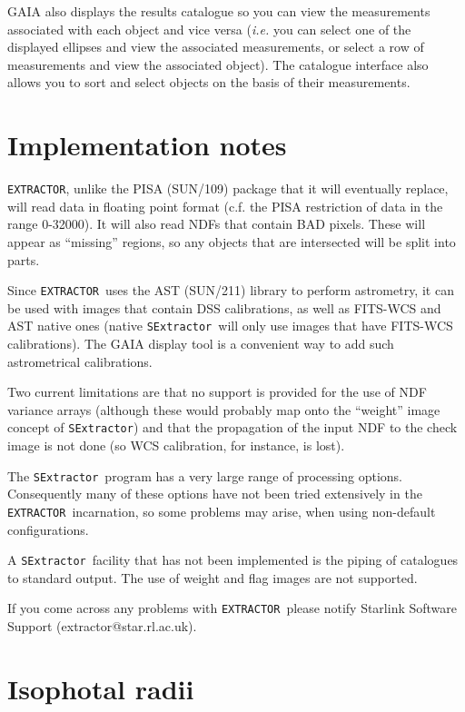 \documentclass[twoside,11pt]{article}
\newcommand{\htmladdnormallink}[2]{#1}
\newcommand{\xref}[3]{#1}
\newcommand{\xlabel}[1]{}
\renewcommand{\_}{\texttt{\symbol{95}}}
\newcommand{\EXTRACTOR}{\texttt{EXTRACTOR}}
\newcommand{\SExtractor}{\texttt{SExtractor}}
\begin{document}
GAIA also displays the results catalogue so you can view the
measurements associated with each object and vice versa (\textit{i.e.}
you can select one of the displayed ellipses and view the associated
measurements, or select a row of measurements and view the associated
object). The catalogue interface also allows you to sort and select
objects on the basis of their measurements.

\section{\label{implementation_notes}\xlabel{implementation_notes}Implementation notes}

\EXTRACTOR, unlike the PISA (\xref{SUN/109}{sun109}{}) package that it
will eventually replace, will read data in floating point format
(c.f. the PISA restriction of data in the range 0-32000).  It will
also read NDFs that contain BAD pixels. These will appear as
``missing'' regions, so any objects that are intersected will be split
into parts.

Since \EXTRACTOR\ uses the AST (\xref{SUN/211}{sun211}{}) library to
perform astrometry, it can be used with images that contain DSS
calibrations, as well as FITS-WCS and AST native ones (native
\SExtractor\ will only use images that have FITS-WCS
calibrations). The GAIA display tool is a convenient way to add such
astrometrical calibrations.

Two current limitations are that no support is provided for the use of
NDF variance arrays (although these would probably map onto the
``weight'' image concept of \SExtractor) and that the propagation of
the input NDF to the check image is not done (so WCS calibration, for
instance, is lost).

The \SExtractor\ program has a very large range of processing
options. Consequently many of these options have not been tried
extensively in the \EXTRACTOR\ incarnation, so some problems may
arise, when using non-default configurations.

A \SExtractor\ facility that has not been implemented is the piping of
catalogues to standard output.  The use of weight and flag images are
not supported.

If you come across any problems with \EXTRACTOR\ please notify
Starlink Software Support
(\htmladdnormallink{extractor@star.rl.ac.uk}{mailto:extractor@star.rl.ac.uk}).

\section{Isophotal radii}
\end{document}
